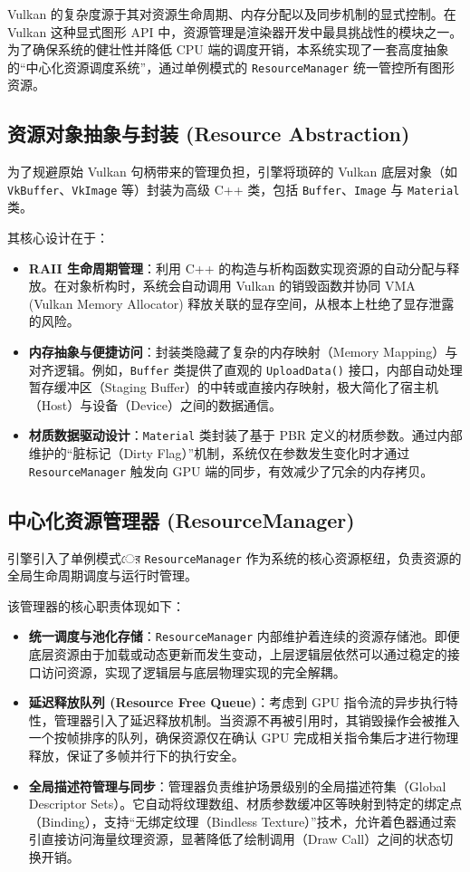 Vulkan 的复杂度源于其对资源生命周期、内存分配以及同步机制的显式控制。在 Vulkan 这种显式图形 API 中，资源管理是渲染器开发中最具挑战性的模块之一。为了确保系统的健壮性并降低 CPU 端的调度开销，本系统实现了一套高度抽象的“中心化资源调度系统”，通过单例模式的 \texttt{ResourceManager} 统一管控所有图形资源。

\subsection{资源对象抽象与封装 (Resource Abstraction)}
为了规避原始 Vulkan 句柄带来的管理负担，引擎将琐碎的 Vulkan 底层对象（如 \texttt{VkBuffer}、\texttt{VkImage} 等）封装为高级 C++ 类，包括 \texttt{Buffer}、\texttt{Image} 与 \texttt{Material} 类。

其核心设计在于：
\begin{itemize}
    \item \textbf{RAII 生命周期管理}：利用 C++ 的构造与析构函数实现资源的自动分配与释放。在对象析构时，系统会自动调用 Vulkan 的销毁函数并协同 VMA (Vulkan Memory Allocator) 释放关联的显存空间，从根本上杜绝了显存泄露的风险。
    \item \textbf{内存抽象与便捷访问}：封装类隐藏了复杂的内存映射（Memory Mapping）与对齐逻辑。例如，\texttt{Buffer} 类提供了直观的 \texttt{UploadData()} 接口，内部自动处理暂存缓冲区（Staging Buffer）的中转或直接内存映射，极大简化了宿主机（Host）与设备（Device）之间的数据通信。
    \item \textbf{材质数据驱动设计}：\texttt{Material} 类封装了基于 PBR 定义的材质参数。通过内部维护的“脏标记（Dirty Flag）”机制，系统仅在参数发生变化时才通过 \texttt{ResourceManager} 触发向 GPU 端的同步，有效减少了冗余的内存拷贝。
\end{itemize}

\subsection{中心化资源管理器 (ResourceManager)}
引擎引入了单例模式ের \texttt{ResourceManager} 作为系统的核心资源枢纽，负责资源的全局生命周期调度与运行时管理。

该管理器的核心职责体现如下：
\begin{itemize}
    \item \textbf{统一调度与池化存储}：\texttt{ResourceManager} 内部维护着连续的资源存储池。即便底层资源由于加载或动态更新而发生变动，上层逻辑层依然可以通过稳定的接口访问资源，实现了逻辑层与底层物理实现的完全解耦。
    \item \textbf{延迟释放队列 (Resource Free Queue)}：考虑到 GPU 指令流的异步执行特性，管理器引入了延迟释放机制。当资源不再被引用时，其销毁操作会被推入一个按帧排序的队列，确保资源仅在确认 GPU 完成相关指令集后才进行物理释放，保证了多帧并行下的执行安全。
    \item \textbf{全局描述符管理与同步}：管理器负责维护场景级别的全局描述符集（Global Descriptor Sets）。它自动将纹理数组、材质参数缓冲区等映射到特定的绑定点（Binding），支持“无绑定纹理（Bindless Texture）”技术，允许着色器通过索引直接访问海量纹理资源，显著降低了绘制调用（Draw Call）之间的状态切换开销。
\end{itemize}

